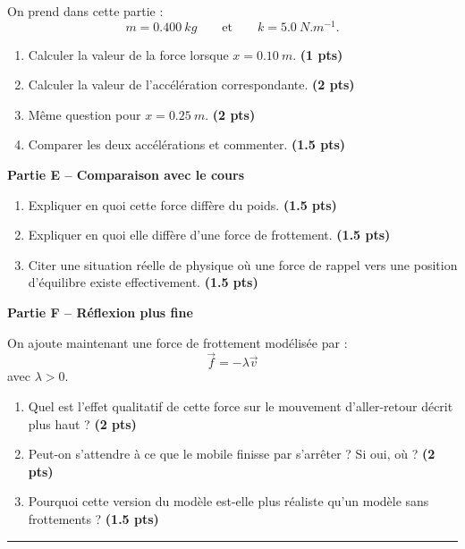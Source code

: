 \documentclass[11pt,a4paper]{article}
\newcommand{\vect}[1]{\overrightarrow{#1}}
\newcommand{\bareme}[1]{\hfill{\color{blue!70!black}\textbf{(#1 pts)}}}
\begin{document}
On prend dans cette partie :
\[
m=\SI{0.400}{kg}
\qquad \text{et} \qquad
k=\SI{5.0}{N.m^{-1}}.
\]

\begin{enumerate}[label=\textbf{D.\arabic*.}, leftmargin=0.9cm]
    \item Calculer la valeur de la force lorsque $x=\SI{0.10}{m}$. \bareme{1}
    \item Calculer la valeur de l’accélération correspondante. \bareme{2}
    \item Même question pour $x=\SI{0.25}{m}$. \bareme{2}
    \item Comparer les deux accélérations et commenter. \bareme{1.5}
\end{enumerate}

\medskip

\textbf{Partie E -- Comparaison avec le cours}

\begin{enumerate}[label=\textbf{E.\arabic*.}, leftmargin=0.9cm]
    \item Expliquer en quoi cette force diffère du poids. \bareme{1.5}
    \item Expliquer en quoi elle diffère d’une force de frottement. \bareme{1.5}
    \item Citer une situation réelle de physique où une force de rappel vers une position d’équilibre existe effectivement. \bareme{1.5}
\end{enumerate}

\medskip

\textbf{Partie F -- Réflexion plus fine}

On ajoute maintenant une force de frottement modélisée par :
\[
\vect{f}=-\lambda \vect{v}
\]
avec $\lambda>0$.

\begin{enumerate}[label=\textbf{F.\arabic*.}, leftmargin=0.9cm]
    \item Quel est l’effet qualitatif de cette force sur le mouvement d’aller-retour décrit plus haut ? \bareme{2}
    \item Peut-on s’attendre à ce que le mobile finisse par s’arrêter ? Si oui, où ? \bareme{2}
    \item Pourquoi cette version du modèle est-elle plus réaliste qu’un modèle sans frottements ? \bareme{1.5}
\end{enumerate}

\vspace{0.4cm}
\hrule
\vspace{0.4cm}
\end{document}

